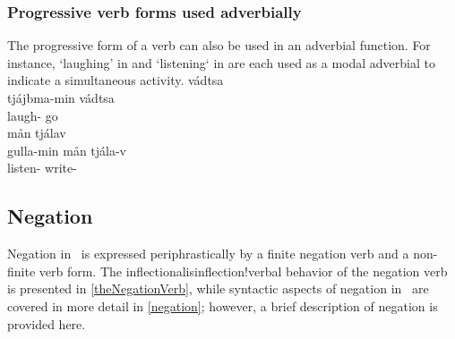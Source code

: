 \subsubsection{Progressive verb forms used adverbially}\label{ADVverbs}
The progressive form of a verb can also be used in an adverbial function. For instance,  ‘laughing’ in  and  ‘listening‘ in  are each used as a modal adverbial to indicate a simultaneous activity. 
\ea\label{ADVverbsEx1}%
 vádtsa\\
	tjájbma-min vádtsa\\
	laugh- go\BS{}\\\nopagebreak
{}	
\z
\ea\label{ADVverbsEx2}%
 mån tjálav\\
	gulla-min mån tjála-v\\
	listen-  write-\\\nopagebreak
{}	
\z



\subsection{Negation}\label{negationVerb}
Negation in \PS\ is expressed periphrastically by a finite negation verb and a non-finite verb form. The inflectionalis{inflection!verbal} behavior of the negation verb is presented in \SEC\ref{theNegationVerb}, while syntactic aspects of negation in \PS\ are covered in more detail in \SEC\ref{negation}; however, a brief description of negation is provided here. 

